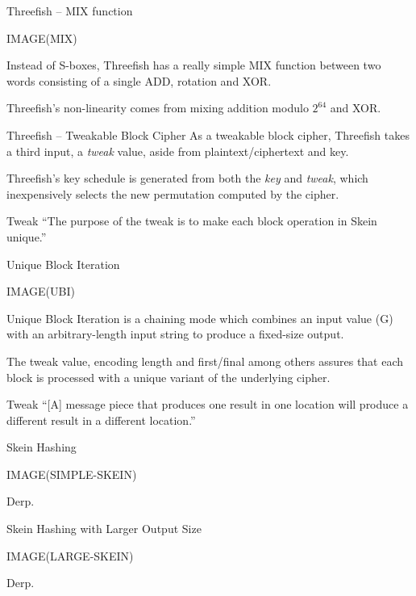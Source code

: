 \documentclass{beamer}
\begin{document}
\begin{frame}{Threefish -- MIX function}

	IMAGE(MIX)\vspace{8mm}

	Instead of S-boxes, Threefish has a really simple MIX function between two words consisting of a single ADD, rotation and XOR.

	\vspace{2mm}
	Threefish's non-linearity comes from mixing addition modulo $2^{64}$ and XOR.

\end{frame}

\begin{frame}{Threefish -- Tweakable Block Cipher}
	As a tweakable block cipher, Threefish takes a third input, a \emph{tweak} value, aside from plaintext/ciphertext and key.

	\vspace{2mm}
	Threefish's key schedule is generated from both the \emph{key} and \emph{tweak}, which inexpensively selects the new permutation computed by the cipher.

	\vspace{2mm}
	\begin{block}{Tweak}
		``The purpose of the tweak is to make each block operation in Skein unique.''
	\end{block}
\end{frame}

\begin{frame}{Unique Block Iteration}

	IMAGE(UBI)\vspace{8mm}

	Unique Block Iteration is a chaining mode which combines an input value (G) with an arbitrary-length input string to produce a fixed-size output.

	\vspace{2mm}
	The tweak value, encoding length and first/final among others assures that each block is processed with a unique variant of the underlying cipher.

	\begin{block}{Tweak}
		``[A] message piece that produces one result in one location will produce a different result in a different location.''
	\end{block}

\end{frame}

\begin{frame}{Skein Hashing}

	IMAGE(SIMPLE-SKEIN)\vspace{8mm}

	Derp.

\end{frame}

\begin{frame}{Skein Hashing with Larger Output Size}

	IMAGE(LARGE-SKEIN)\vspace{8mm}

	Derp.

\end{frame}
\end{document}
